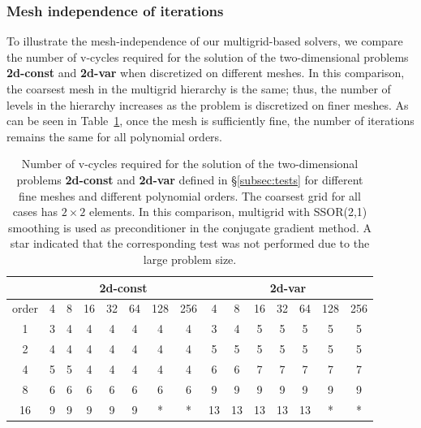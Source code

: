 \documentclass[smallcondensed,final]{svjour3}     %
\begin{document}
\subsubsection{Mesh independence of iterations}\label{subsec:num_mesh}
To illustrate the mesh-independence of our multigrid-based solvers, we
compare the number of v-cycles required for the solution of the
two-dimensional problems {\bf 2d-const} and {\bf 2d-var} when
discretized on different meshes. In this comparison, the coarsest mesh
in the multigrid hierarchy is the same; thus, the number of levels in the
hierarchy increases as the problem is discretized on finer meshes. As
can be seen in Table~\ref{tab:meshInd}, once the mesh is sufficiently
fine, the number of iterations remains the same  for all polynomial orders.
\begin{table}[h]\centering
\caption{\label{tab:meshInd} Number of v-cycles required for the
  solution of the two-dimensional problems {\bf 2d-const} and {\bf
    2d-var} defined in \S\ref{subsec:tests} for different fine
  meshes and different polynomial orders. The coarsest grid for all
  cases has $2\times 2$ elements. In this comparison, multigrid with
  SSOR(2,1) smoothing is used as preconditioner in the conjugate
  gradient method. A star indicated that the
  corresponding test was not performed due to the large problem size.}
\begin{tabular}{|c|c|c|c|c|c|c|c||c|c|c|c|c|c|c|}
	\hline
	 & \multicolumn{7}{c||}{\bf 2d-const} &
        \multicolumn{7}{c|}{\bf 2d-var} \\  
  \hline
	order & 4  &  8 & 16 & 32 & 64 & 128 & 256 & 4  &  8 & 16 & 32 & 64 & 128 & 256 \\
	\hline 
	 1    &  3 &  4 &  4 &  4 &  4 &  4  &  4  & 3  &  4 & 5  &  5 &  5 &  5  &  5  \\
	 2    &  4 &  4 &  4 &  4 &  4 &  4  &  4  & 5  &  5 & 5  &  5 &  5 &  5  &  5  \\
	 4    &  5 &  5 &  4 &  4 &  4 &  4  &  4  & 6  &  6 & 7  &  7 &  7 &  7  &  7  \\
	 8    &  6 &  6 &  6 &  6 &  6 &  6  &  6  & 9  &  9 & 9  &  9 &  9 &  9  &  9  \\
	 16   &  9 &  9 &  9 &  9 &  9 &  *  &  *  & 13 & 13 & 13 & 13 & 13 &  *  &  *  \\
	 \hline
\end{tabular}

\end{table}
\end{document}

